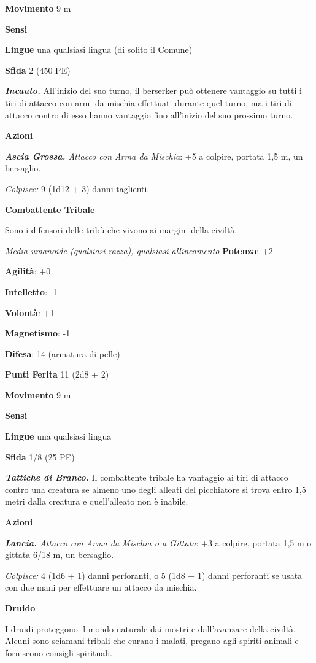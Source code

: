 \begin{multicols}{2}
\textbf{Movimento} 9 m

\textbf{Sensi} 

\textbf{Lingue} una qualsiasi lingua (di solito il Comune)

\textbf{Sfida} 2 (450 PE)

\emph{\textbf{Incauto.}} All'inizio del suo turno, il berserker può
ottenere vantaggio su tutti i tiri di attacco con armi da mischia
effettuati durante quel turno, ma i tiri di attacco contro di esso hanno
vantaggio fino all'inizio del suo prossimo turno.

\textbf{Azioni}

\emph{\textbf{Ascia Grossa.} Attacco con Arma da Mischia}: +5 a colpire,
portata 1,5 m, un bersaglio.

\emph{Colpisce:} 9 (1d12 + 3) danni taglienti.

\textbf{Combattente Tribale}

Sono i difensori delle tribù che vivono ai margini della civiltà.

\emph{Media umanoide (qualsiasi razza), qualsiasi allineamento}
\textbf{Potenza}: +2

\textbf{Agilità}: +0

\textbf{Intelletto}: -1

\textbf{Volontà}: +1

\textbf{Magnetismo}: -1

\textbf{Difesa}: 14 (armatura di pelle)

\textbf{Punti Ferita} 11 (2d8 + 2)

\textbf{Movimento} 9 m

\textbf{Sensi} 

\textbf{Lingue} una qualsiasi lingua

\textbf{Sfida} 1/8 (25 PE)

\emph{\textbf{Tattiche di Branco.}} Il combattente tribale ha vantaggio
ai tiri di attacco contro una creatura se almeno uno degli alleati del
picchiatore si trova entro 1,5 metri dalla creatura e quell'alleato non
è inabile.

\textbf{Azioni}

\emph{\textbf{Lancia.} Attacco con Arma da Mischia o a Gittata}: +3 a
colpire, portata 1,5 m o gittata 6/18 m, un bersaglio.

\emph{Colpisce:} 4 (1d6 + 1) danni perforanti, o 5 (1d8 + 1) danni
perforanti se usata con due mani per effettuare un attacco da mischia.

\textbf{Druido}

I druidi proteggono il mondo naturale dai mostri e dall'avanzare della
civiltà. Alcuni sono sciamani tribali che curano i malati, pregano agli
spiriti animali e forniscono consigli spirituali.


\end{multicols}
